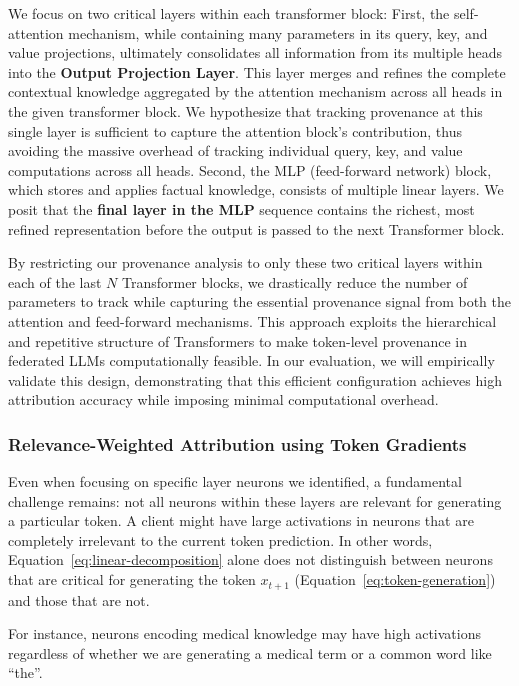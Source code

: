 We focus on two critical layers within each transformer block:
First, the self-attention mechanism, while containing many parameters in its query, key, and value projections, ultimately consolidates all information from its multiple heads into the \textbf{Output Projection Layer}.
This layer merges and refines the complete contextual knowledge aggregated by the attention mechanism across all heads in the given transformer block.
We hypothesize that tracking provenance at this single layer is sufficient to capture the attention block's contribution, thus avoiding the massive overhead of tracking individual query, key, and value computations across all heads.
Second, the MLP (feed-forward network) block, which stores and applies factual knowledge, consists of multiple linear layers.
We posit that the \textbf{final layer in the MLP} sequence contains the richest, most refined representation before the output is passed to the next Transformer block.

By restricting our provenance analysis to only these two critical layers within each of the last $N$ Transformer blocks, we drastically reduce the number of parameters to track while capturing the essential provenance signal from both the attention and feed-forward mechanisms.
This approach exploits the hierarchical and repetitive structure of Transformers to make token-level provenance in federated LLMs computationally feasible.
In our evaluation, we will empirically validate this design, demonstrating that this efficient configuration achieves high attribution accuracy while imposing minimal computational overhead.



\subsubsection{Relevance-Weighted Attribution using Token Gradients}
Even when focusing on specific layer neurons we identified, a fundamental challenge remains: not all neurons within these layers are relevant for generating a particular token.
A client might have large activations in neurons that are completely irrelevant to the current token prediction.
In other words, Equation~\ref{eq:linear-decomposition} alone does not distinguish between neurons that are critical for generating the token $x_{t+1}$ (Equation~\ref{eq:token-generation}) and those that are not.

For instance, neurons encoding medical knowledge may have high activations regardless of whether we are generating a medical term or a common word like ``the''.

